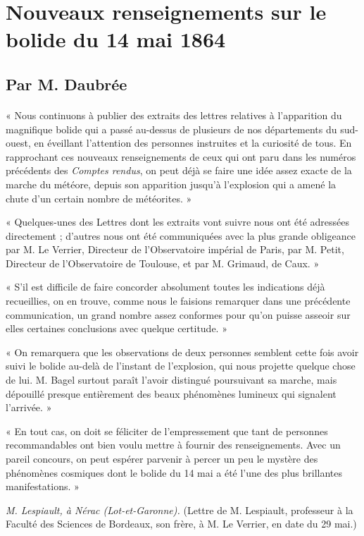 \documentclass[a4paper, 11pt, oneside, polutonikogreek, french]{article}
\begin{document}
\section{Nouveaux renseignements sur le bolide du 14 mai 1864}
\subsection*{Par M. Daubrée}
\paragraph{}
« Nous continuons à publier des extraits des lettres relatives à l'apparition du magnifique bolide qui a passé au-dessus de plusieurs de nos départements du sud-ouest, en éveillant l'attention des personnes instruites et la curiosité de tous. En rapprochant ces nouveaux renseignements de ceux qui ont paru dans les numéros précédents des \emph{Comptes rendus}, on peut déjà se faire une idée assez exacte de la marche du météore, depuis son apparition jusqu'à l'explosion qui a amené la chute d'un certain nombre de météorites. »

« Quelques-unes des Lettres dont les extraits vont suivre nous ont été adressées directement ; d'autres nous ont été communiquées avec la plus grande obligeance par M. Le Verrier, Directeur de l'Observatoire impérial de Paris, par M. Petit, Directeur de l'Observatoire de Toulouse, et par M. Grimaud, de Caux. »

« S'il est difficile de faire concorder absolument toutes les indications déjà recueillies, on en trouve, comme nous le faisions remarquer dans une précédente communication, un grand nombre assez conformes pour qu'on puisse asseoir sur elles certaines conclusions avec quelque certitude. »

« On remarquera que les observations de deux personnes semblent cette fois avoir suivi le bolide au-delà de l'instant de l'explosion, qui nous projette quelque chose de lui. M. Bagel surtout paraît l'avoir distingué poursuivant sa marche, mais dépouillé presque entièrement des beaux phénomènes lumineux qui signalent l'arrivée. »

« En tout cas, on doit se féliciter de l'empressement que tant de personnes recommandables ont bien voulu mettre à fournir des renseignements. Avec un pareil concours, on peut espérer parvenir à percer un peu le mystère des phénomènes cosmiques dont le bolide du 14 mai a été l'une des plus brillantes manifestations. »
\begin{center}
\emph{M. Lespiault, à Nérac (Lot-et-Garonne).} (Lettre de M. Lespiault, professeur à la Faculté des Sciences de Bordeaux, son frère, à M. Le Verrier, en date du 29 mai.)
\end{center}
\end{document}
